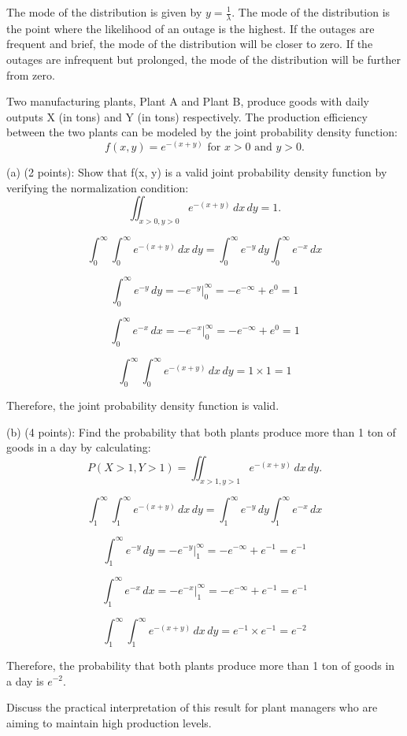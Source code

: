 \documentclass{article}
\begin{document}
The mode of the distribution is given by \(y = \frac{1}{\lambda}\). The mode of the distribution is the point where the likelihood of an outage is the highest. If the outages are frequent and brief, the mode of the distribution will be closer to zero. If the outages are infrequent but prolonged, the mode of the distribution will be further from zero.

Two manufacturing plants, Plant A and Plant B, produce goods with daily outputs X (in tons) and Y (in tons) respectively. The production efficiency between the two plants can be modeled by the joint probability density function:
\[f(x, y) = e^{-(x+y)} \text{ for } x > 0 \text{ and } y > 0.\]

(a) (2 points): Show that f(x, y) is a valid joint probability density function by verifying the
normalization condition:
\[\iint_{x > 0, y > 0} e^{-(x+y)} \, dx \, dy = 1.\]

\[\int_{0}^{\infty}\int_{0}^{\infty}e^{-(x+y)} \, dx \, dy = \int_{0}^{\infty}e^{-y} \, dy \int_{0}^{\infty}e^{-x} \, dx\]

\[\int_{0}^{\infty}e^{-y} \, dy = -e^{-y}\Big|_{0}^{\infty} = -e^{-\infty} + e^{0} = 1\]

\[\int_{0}^{\infty}e^{-x} \, dx = -e^{-x}\Big|_{0}^{\infty} = -e^{-\infty} + e^{0} = 1\]

\[\int_{0}^{\infty}\int_{0}^{\infty}e^{-(x+y)} \, dx \, dy = 1 \times 1 = 1\]

Therefore, the joint probability density function is valid.

(b) (4 points): Find the probability that both plants produce more than 1 ton of goods in a day
by calculating:
\[
P(X > 1, Y > 1) =
\iint_{x > 1, y > 1} e^{-(x+y)} \, dx \, dy.
\]

\[\int_{1}^{\infty}\int_{1}^{\infty}e^{-(x+y)} \, dx \, dy = \int_{1}^{\infty}e^{-y} \, dy \int_{1}^{\infty}e^{-x} \, dx\]

\[\int_{1}^{\infty}e^{-y} \, dy = -e^{-y}\Big|_{1}^{\infty} = -e^{-\infty} + e^{-1} = e^{-1}\]

\[\int_{1}^{\infty}e^{-x} \, dx = -e^{-x}\Big|_{1}^{\infty} = -e^{-\infty} + e^{-1} = e^{-1}\]

\[\int_{1}^{\infty}\int_{1}^{\infty}e^{-(x+y)} \, dx \, dy = e^{-1} \times e^{-1} = e^{-2}\]

Therefore, the probability that both plants produce more than 1 ton of goods in a day is \(e^{-2}\).

Discuss the practical interpretation of this result for plant managers who are aiming to maintain
high production levels.
\end{document}
